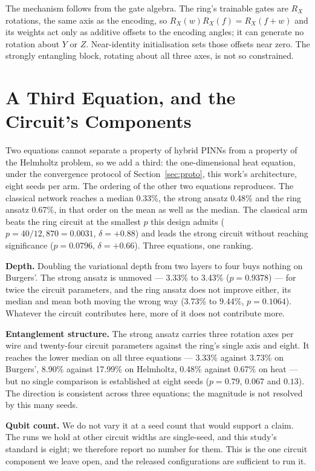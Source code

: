\documentclass[conference,a4paper]{IEEEtran}
\begin{document}
The mechanism follows from the gate algebra. The ring's trainable gates are $R_X$
rotations, the same axis as the encoding, so $R_X(w)R_X(f) = R_X(f+w)$ and its weights act
only as additive offsets to the encoding angles; it can generate no rotation about $Y$ or
$Z$. Near-identity initialisation sets those offsets near zero. The strongly entangling
block, rotating about all three axes, is not so constrained.

\section{A Third Equation, and the Circuit's Components}
\label{sec:third}

Two equations cannot separate a property of hybrid PINNs from a property of the
Helmholtz problem, so we add a third: the one-dimensional heat equation, under the
convergence protocol of Section~\ref{sec:proto}, this work's architecture, eight seeds per
arm. The ordering of the other two equations reproduces. The classical network reaches a
median 0.33\%, the strong ansatz 0.48\% and the ring ansatz 0.67\%, in that order on the
mean as well as the median. The classical arm beats the ring circuit at the smallest
$p$ this design admits ($p = 40/12{,}870 = 0.0031$, $\delta = +0.88$) and leads the strong
circuit without reaching significance ($p = 0.0796$, $\delta = +0.66$). Three equations,
one ranking.

\textbf{Depth.} Doubling the variational depth from two layers to four buys nothing on
Burgers'. The strong ansatz is unmoved --- 3.33\% to 3.43\% ($p = 0.9378$) --- for twice
the circuit parameters, and the ring ansatz does not improve either, its median and mean
both moving the wrong way (3.73\% to 9.44\%, $p = 0.1064$). Whatever the circuit
contributes here, more of it does not contribute more.

\textbf{Entanglement structure.} The strong ansatz carries three rotation axes per wire
and twenty-four circuit parameters against the ring's single axis and eight. It reaches
the lower median on all three equations --- 3.33\% against 3.73\% on Burgers', 8.90\%
against 17.99\% on Helmholtz, 0.48\% against 0.67\% on heat --- but no single comparison
is established at eight seeds ($p = 0.79$, $0.067$ and $0.13$). The direction is
consistent across three equations; the magnitude is not resolved by this many seeds.

\textbf{Qubit count.} We do not vary it at a seed count that would support a claim. The
runs we hold at other circuit widths are single-seed, and this study's standard is eight;
we therefore report no number for them. This is the one circuit component we leave open,
and the released configurations are sufficient to run it.
\end{document}
